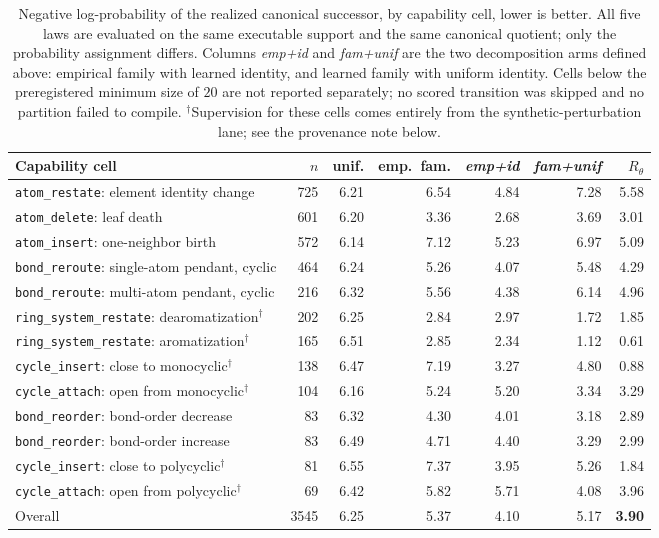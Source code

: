 \documentclass{article}
\theoremstyle{definition}
\theoremstyle{remark}
\newcommand{\op}[1]{\texttt{#1}}
\begin{document}
\begin{table}[h]
\centering
{\scriptsize\setlength{\tabcolsep}{4pt}
\begin{tabular}{lrrrrrr}
\toprule
Capability cell & $n$ & unif. & emp.\ fam. & \emph{emp+id} & \emph{fam+unif} & $R_\theta$ \\
\midrule
\op{atom\_restate}: element identity change      & 725 & 6.21 & 6.54 & 4.84 & 7.28 & 5.58 \\
\op{atom\_delete}: leaf death                    & 601 & 6.20 & 3.36 & 2.68 & 3.69 & 3.01 \\
\op{atom\_insert}: one-neighbor birth            & 572 & 6.14 & 7.12 & 5.23 & 6.97 & 5.09 \\
\op{bond\_reroute}: single-atom pendant, cyclic  & 464 & 6.24 & 5.26 & 4.07 & 5.48 & 4.29 \\
\op{bond\_reroute}: multi-atom pendant, cyclic   & 216 & 6.32 & 5.56 & 4.38 & 6.14 & 4.96 \\
\op{ring\_system\_restate}: dearomatization$^{\dagger}$ & 202 & 6.25 & 2.84 & 2.97 & 1.72 & 1.85 \\
\op{ring\_system\_restate}: aromatization$^{\dagger}$   & 165 & 6.51 & 2.85 & 2.34 & 1.12 & 0.61 \\
\op{cycle\_insert}: close to monocyclic$^{\dagger}$     & 138 & 6.47 & 7.19 & 3.27 & 4.80 & 0.88 \\
\op{cycle\_attach}: open from monocyclic$^{\dagger}$    & 104 & 6.16 & 5.24 & 5.20 & 3.34 & 3.29 \\
\op{bond\_reorder}: bond-order decrease          &  83 & 6.32 & 4.30 & 4.01 & 3.18 & 2.89 \\
\op{bond\_reorder}: bond-order increase          &  83 & 6.49 & 4.71 & 4.40 & 3.29 & 2.99 \\
\op{cycle\_insert}: close to polycyclic$^{\dagger}$     &  81 & 6.55 & 7.37 & 3.95 & 5.26 & 1.84 \\
\op{cycle\_attach}: open from polycyclic$^{\dagger}$    &  69 & 6.42 & 5.82 & 5.71 & 4.08 & 3.96 \\
\midrule
Overall                                          & 3545 & 6.25 & 5.37 & 4.10 & 5.17 & \textbf{3.90} \\
\bottomrule
\end{tabular}}
\caption{\small Negative log-probability of the realized canonical successor, by capability cell, lower is better. All five laws are evaluated on the same executable support and the same canonical quotient; only the probability assignment differs. Columns \emph{emp+id} and \emph{fam+unif} are the two decomposition arms defined above: empirical family with learned identity, and learned family with uniform identity. Cells below the preregistered minimum size of $20$ are not reported separately; no scored transition was skipped and no partition failed to compile. $^{\dagger}$Supervision for these cells comes entirely from the synthetic-perturbation lane; see the provenance note below.}
\label{tab:rtheta-cells}
\end{table}
\end{document}

